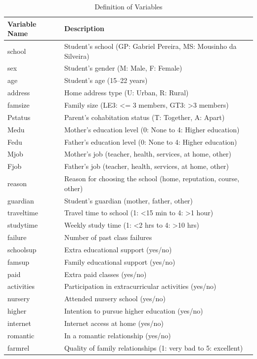 \documentclass[conference]{IEEEtran}
\begin{document}
\begin{table}[htpb]
\centering
\caption{Definition of Variables}
\label{tab:sample}
\begin{tabular}{|l|l|}
\hline
\textbf{Variable Name} & \textbf{Description} \\
\hline
school & Student’s school (GP: Gabriel Pereira, MS: Mousinho da Silveira)  \\
sex & Student’s gender (M: Male, F: Female)  \\
age & Student’s age (15–22 years)  \\
address & Home address type (U: Urban, R: Rural) \\
famsize & Family size (LE3: <= 3 members, GT3: >3 members)  \\
Pstatus & Parent’s cohabitation status (T: Together, A: Apart) \\
Medu & Mother’s education level (0: None to 4: Higher education) \\
Fedu & Father’s education level (0: None to 4: Higher education)  \\
Mjob & Mother’s job (teacher, health, services, at home, other)  \\
Fjob & Father’s job (teacher, health, services, at home, other) \\
reason & Reason for choosing the school (home, reputation, course, other) \\
guardian & Student’s guardian (mother, father, other)  \\
traveltime & Travel time to school (1: <15 min to 4: >1 hour) \\
studytime & Weekly study time (1: <2 hrs to 4: >10 hrs) \\
failure & Number of past class failures  \\
schoolsup & Extra educational support (yes/no)  \\
famsup & Family educational support (yes/no) \\
paid & Extra paid classes (yes/no) \\
activities & Participation in extracurricular activities (yes/no) \\ 
nursery & Attended nursery school (yes/no) \\
higher & Intention to pursue higher education (yes/no)  \\
internet & Internet access at home (yes/no) \\
romantic & In a romantic relationship (yes/no) \\
farmrel & Quality of family relationships (1: very bad to 5: excellent)  \\

\end{tabular}
\end{table}
\end{document}
